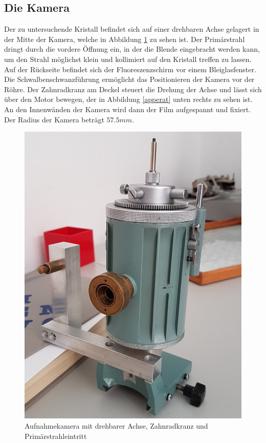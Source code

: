 
	\subsection{Die Kamera} %
	\label{sub:die_kamera}
		
		Der zu untersuchende Kristall befindet sich auf einer drehbaren Achse gelagert in der Mitte der Kamera, welche in Abbildung \ref{fig:kamera} zu sehen ist.
		Der Primärstrahl dringt durch die vordere Öffnung ein, in der die Blende eingebracht werden kann, um den Strahl möglichst klein und kollimiert auf den Kristall treffen zu lassen.
		Auf der Rückseite befindet sich der Fluoreszenzschirm vor einem Bleiglasfenster.
		Die Schwalbenschwanzführung ermöglicht das Positionieren der Kamera vor der Röhre.
		Der Zahnradkranz am Deckel steuert die Drehung der Achse und lässt sich über den Motor bewegen, der in Abbildung \ref{apperat} unten rechts zu sehen ist.
		An den Innenwänden der Kamera wird dann der Film aufgespannt und fixiert.
		Der Radius der Kamera beträgt $57.5\unit{mm}$.

		\begin{figure}[htb]
			\centering
			\includegraphics[scale = 0.2]{images/kamera-2.jpg}
			\caption{Aufnahmekamera mit drehbarer Achse, Zahnradkranz und Primärstrahleintritt}
			\label{fig:kamera}
		\end{figure}

